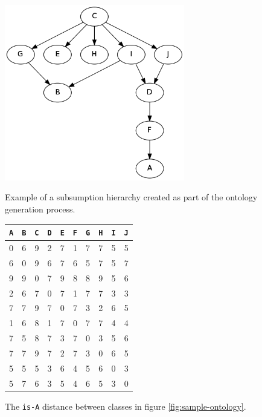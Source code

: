 \begin{figure}[t]
\begin{minipage}[b]{0.5\linewidth}
\centering
\includegraphics[width=0.7\textwidth]{media/chapter6/sample-ontology.png}
\caption{Example of a subsumption hierarchy created as part of the ontology generation process.}
\label{fig:sample-ontology}
\end{minipage}
\hspace{0.5cm}
\begin{minipage}[b]{0.45\linewidth}

\begin{tabular}{ |c|c|c|c|c|c|c|c|c|c| }
  \hline
  \texttt{A} & \texttt{B} & \texttt{C} & \texttt{D} & \texttt{E} & \texttt{F} & \texttt{G} & \texttt{H} & \texttt{I} & \texttt{J} \\
  \hline
    0  &  6  &  9  &  2  &  7  &  1  &  7  &  7  &  5  &  5 \\
    6  &  0  &  9  &  6  &  7  &  6  &  5  &  7  &  5  &  7 \\
    9  &  9  &  0  &  7  &  9  &  8  &  8  &  9  &  5  &  6 \\
    2  &  6  &  7  &  0  &  7  &  1  &  7  &  7  &  3  &  3 \\
    7  &  7  &  9  &  7  &  0  &  7  &  3  &  2  &  6  &  5 \\
    1  &  6  &  8  &  1  &  7  &  0  &  7  &  7  &  4  &  4 \\
    7  &  5  &  8  &  7  &  3  &  7  &  0  &  3  &  5  &  6 \\
    7  &  7  &  9  &  7  &  2  &  7  &  3  &  0  &  6  &  5 \\
    5  &  5  &  5  &  3  &  6  &  4  &  5  &  6  &  0  &  3 \\
    5  &  7  &  6  &  3  &  5  &  4  &  6  &  5  &  3  &  0 \\
  \hline
\end{tabular}
\caption{The \texttt{is-A} distance between classes in figure \ref{fig:sample-ontology}.}
\label{tbl:semantic-distance}
\end{minipage}
\end{figure}

